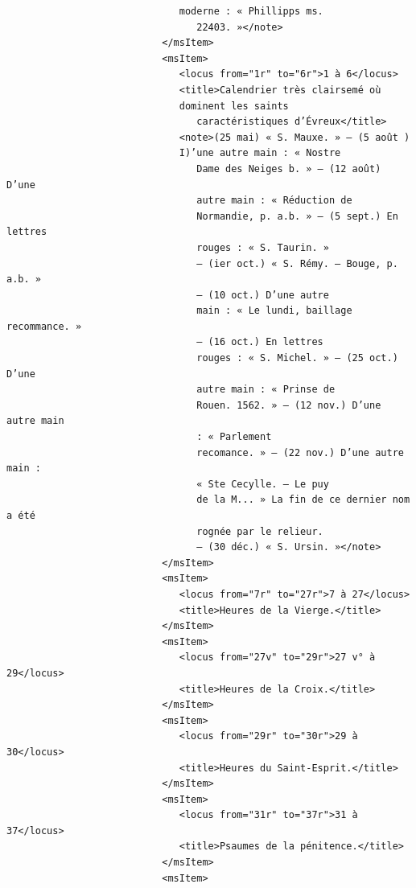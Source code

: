 \documentclass[a4paper,12pt,twoside]{book}
\begin{document}
\begin{verbatim}
                              moderne : « Phillipps ms.
                                 22403. »</note>
                           </msItem>
                           <msItem>
                              <locus from="1r" to="6r">1 à 6</locus>
                              <title>Calendrier très clairsemé où 
                              dominent les saints
                                 caractéristiques d’Évreux</title>
                              <note>(25 mai) « S. Mauxe. » — (5 août )
                              I)’une autre main : « Nostre
                                 Dame des Neiges b. » — (12 août) D’une 
                                 autre main : « Réduction de
                                 Normandie, p. a.b. » — (5 sept.) En lettres
                                 rouges : « S. Taurin. »
                                 — (ier oct.) « S. Rémy. — Bouge, p. a.b. »
                                 — (10 oct.) D’une autre
                                 main : « Le lundi, baillage recommance. »
                                 — (16 oct.) En lettres
                                 rouges : « S. Michel. » — (25 oct.) D’une
                                 autre main : « Prinse de
                                 Rouen. 1562. » — (12 nov.) D’une autre main 
                                 : « Parlement
                                 recomance. » — (22 nov.) D’une autre main : 
                                 « Ste Cecylle. — Le puy
                                 de la M... » La fin de ce dernier nom a été 
                                 rognée par le relieur.
                                 — (30 déc.) « S. Ursin. »</note>
                           </msItem>
                           <msItem>
                              <locus from="7r" to="27r">7 à 27</locus>
                              <title>Heures de la Vierge.</title>
                           </msItem>
                           <msItem>
                              <locus from="27v" to="29r">27 v° à 29</locus>
                              <title>Heures de la Croix.</title>
                           </msItem>
                           <msItem>
                              <locus from="29r" to="30r">29 à 30</locus>
                              <title>Heures du Saint-Esprit.</title>
                           </msItem>
                           <msItem>
                              <locus from="31r" to="37r">31 à 37</locus>
                              <title>Psaumes de la pénitence.</title>
                           </msItem>
                           <msItem>

\end{verbatim}
\end{document}
